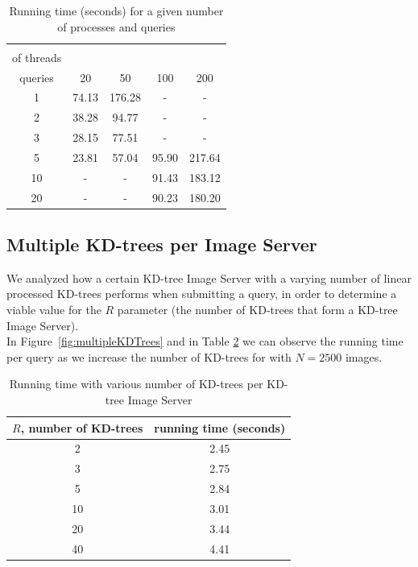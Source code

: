 \begin{table}[H]
\centering
\begin{tabular} {c | c | c | c | c}
	\backslashbox{number\\ of threads}{number of\\ queries} & 20 & 50 & 100 & 200 \\
	\hline
	1 & 74.13 & 176.28 & - & - \\
	2 & 38.28 & 94.77 & - & - \\
	3 & 28.15 & 77.51 & - & -\\
	5 & 23.81 & 57.04 & 95.90 & 217.64\\
	10 & - & - & 91.43 & 183.12 \\
	20 & - & - & 90.23 & 180.20 \\
\end{tabular}
\caption{Running time (seconds) for a given number of processes and queries}
\label{table:threadTime}
\end{table}

\subsection{Multiple KD-trees per Image Server}

We analyzed how a certain KD-tree Image Server with a varying number of linear processed KD-trees performs when submitting a query, in order to determine a viable value for the $R$ parameter (the number of KD-trees that form a KD-tree Image Server).\\
In Figure~\ref{fig:multipleKDTrees} and in Table \ref{table:multipleKDTrees} we can observe the running time per query as we increase the number of KD-trees for with $N=2500$ images.\\

\begin{table}[H]
\centering
\begin{tabular}{c | c}
	$R$, number of KD-trees & running time (seconds) \\
	\hline
	2 & 2.45 \\
	3 & 2.75 \\
	5 & 2.84 \\
	10 & 3.01 \\
	20 & 3.44 \\
	40 & 4.41 \\
\end{tabular}
\caption{Running time with various number of KD-trees per KD-tree Image Server}
\label{table:multipleKDTrees}
\end{table}

